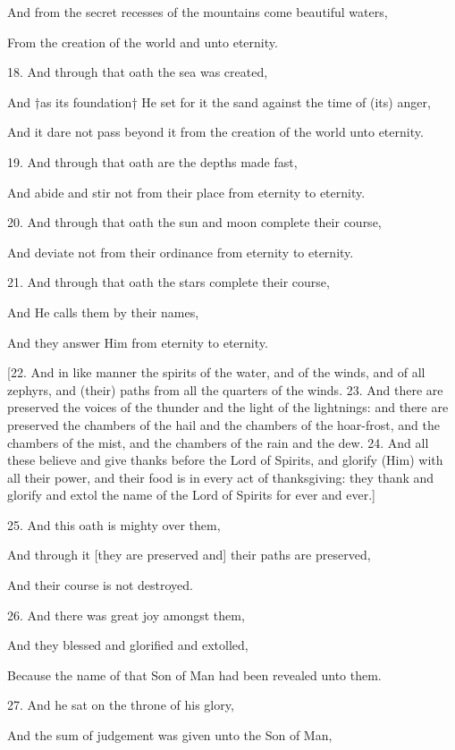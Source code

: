 And from the secret recesses of the mountains come beautiful waters,

From the creation of the world and unto eternity.

18. And through that oath the sea was created,

And †as its foundation† He set for it the sand against the time of (its) anger,

And it dare not pass beyond it from the creation of the world unto eternity.

19. And through that oath are the depths made fast,

And abide and stir not from their place from eternity to eternity.

20. And through that oath the sun and moon complete their course,

And deviate not from their ordinance from eternity to eternity.

21. And through that oath the stars complete their course,

And He calls them by their names,

And they answer Him from eternity to eternity.

[22. And in like manner the spirits of the water,
and of the winds, and of all zephyrs, and (their) paths
from all the quarters of the winds. 23. And there
are preserved the voices of the thunder and the light
of the lightnings: and there are preserved the
chambers of the hail and the chambers of the hoar-frost,
and the chambers of the mist, and the chambers
of the rain and the dew. 24. And all these believe
and give thanks before the Lord of Spirits, and glorify
(Him) with all their power, and their food is in every
act of thanksgiving: they thank and glorify and
extol the name of the Lord of Spirits for ever and
ever.]

25. And this oath is mighty over them,

And through it [they are preserved and] their paths are preserved,

And their course is not destroyed.


26. And there was great joy amongst them,

And they blessed and glorified and extolled,

Because the name of that Son of Man had been revealed unto them.

27. And he sat on the throne of his glory,

And the sum of judgement was given unto the Son of Man,

